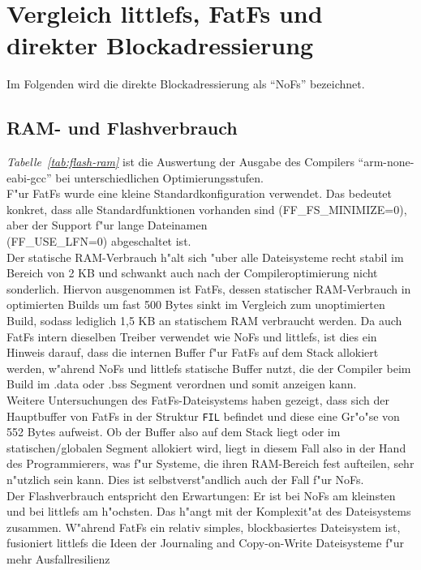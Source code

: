 \documentclass[11pt]{article}
\newcommand*{\tab}[1]{\textit{Tabelle~\ref{#1}}}
\begin{document}
\section{Vergleich littlefs, FatFs und direkter Blockadressierung}
Im Folgenden wird die direkte Blockadressierung als \enquote{NoFs} bezeichnet.

\subsection{RAM- und Flashverbrauch}\label{sec:ramflash}
\tab{tab:flash-ram} ist die Auswertung der Ausgabe des Compilers \enquote{arm-none-eabi-gcc} bei
unterschiedlichen Optimierungsstufen. \\
F"ur FatFs wurde eine kleine Standardkonfiguration verwendet.
Das bedeutet konkret, dass alle Standardfunktionen vorhanden sind (FF\_FS\_MINIMIZE=0),
aber der Support f"ur lange Dateinamen \\ (FF\_USE\_LFN=0) abgeschaltet ist. \\
Der statische RAM-Verbrauch h"alt sich "uber alle Dateisysteme
recht stabil im Bereich von 2 KB und schwankt auch nach der Compileroptimierung nicht sonderlich.
Hiervon ausgenommen ist FatFs, dessen statischer RAM-Verbrauch in optimierten Builds um fast 500 Bytes sinkt
im Vergleich zum unoptimierten Build, sodass lediglich 1,5 KB an statischem RAM verbraucht werden.
Da auch FatFs intern dieselben Treiber verwendet wie NoFs und littlefs, ist dies ein Hinweis darauf,
dass die internen Buffer f"ur FatFs auf dem Stack allokiert werden, w"ahrend NoFs und littlefs statische
Buffer nutzt, die der Compiler beim Build im .data oder .bss Segment verordnen und somit anzeigen kann.\\
Weitere Untersuchungen des FatFs-Dateisystems haben gezeigt, dass sich der Hauptbuffer von FatFs in
der Struktur \texttt{FIL} befindet und diese eine Gr"o"se von 552 Bytes aufweist. Ob der Buffer also auf dem Stack liegt oder
im statischen/globalen Segment allokiert wird, liegt in diesem Fall also in der Hand des Programmierers,
was f"ur Systeme, die ihren RAM-Bereich fest aufteilen, sehr n"utzlich sein kann. Dies ist selbstverst"andlich
auch der Fall f"ur NoFs.
\\
Der Flashverbrauch entspricht den Erwartungen:
Er ist bei NoFs am kleinsten und bei littlefs am h"ochsten. Das h"angt mit der Komplexit"at
des Dateisystems zusammen. W"ahrend FatFs ein relativ simples, blockbasiertes Dateisystem ist,
fusioniert littlefs die Ideen der Journaling and Copy-on-Write Dateisysteme f"ur mehr Ausfallresilienz
\end{document}
